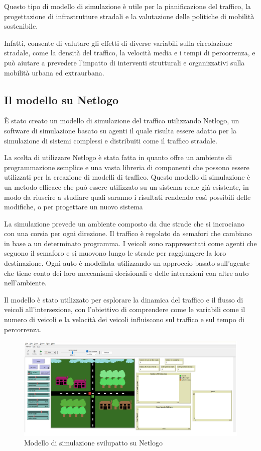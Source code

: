 \documentclass[11pt]{article}
\begin{document}
Questo tipo di modello di simulazione è utile per la pianificazione del traffico, la progettazione di infrastrutture stradali e la valutazione delle politiche di mobilità sostenibile.

Infatti, consente di valutare gli effetti di diverse variabili sulla circolazione stradale, come la densità del traffico, la velocità media e i tempi di percorrenza, e può aiutare a prevedere l'impatto di interventi strutturali e organizzativi sulla mobilità urbana ed extraurbana.

\subsection{Il modello su Netlogo}
È stato creato un modello di simulazione del traffico utilizzando Netlogo, un software di simulazione basato su agenti il quale risulta essere adatto per la simulazione di sistemi complessi e distribuiti come il traffico stradale.

La scelta di utilizzare Netlogo è stata fatta in quanto offre un ambiente di programmazione semplice e una vasta libreria di componenti che possono essere utilizzati per la creazione di modelli di traffico. Questo modello di simulazione è un metodo efficace che può essere utilizzato su un sistema reale già esistente, in modo da riuscire a studiare quali saranno $\mathrm{i}$ risultati rendendo così possibili delle modifiche, o per progettare un nuovo sistema

La simulazione prevede un ambiente composto da due strade che si incrociano con una corsia per ogni direzione. Il traffico è regolato da semafori che cambiano in base a un determinato programma. I veicoli sono rappresentati come agenti che seguono il semaforo e si muovono lungo le strade per raggiungere la loro destinazione. Ogni auto è modellata utilizzando un approccio basato sull'agente che tiene conto dei loro meccanismi decisionali e delle interazioni con altre auto nell'ambiente.

Il modello è stato utilizzato per esplorare la dinamica del traffico e il flusso di veicoli all'intersezione, con l'obiettivo di comprendere come le variabili come il numero di veicoli e la velocità dei veicoli influiscono sul traffico e sul tempo di percorrenza.

\begin{figure}
    \centering
    \includegraphics[width=1\textwidth]{fig1.png}
    \caption{Modello di simulazione svilupatto su Netlogo}
\end{figure}
\end{document}
